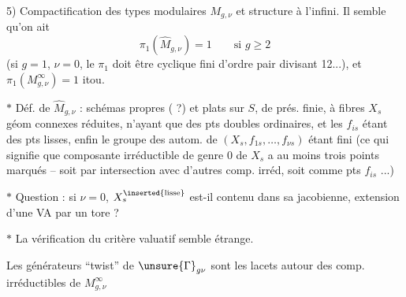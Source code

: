 5) Compactification des types modulaires $M_{g,\nu}$ et structure à l'infini. Il semble qu'on ait
\[
\pi_1(\widehat M_{g,\nu})=1\qquad\text{si }g\geq2
\]
(si $g=1$, $\nu=0$, le $\pi_1$ doit être cyclique fini d'ordre pair divisant 12...), et $\pi_1(M_{g,\nu}^{\infty})=1$ itou.

$*$ Déf. de $\widehat M_{g,\nu}$ : schémas  propres ( ?)  et plats sur $S$, de prés. finie, à fibres $X_s$ géom connexes réduites, n'ayant que des pts doubles ordinaires, et les $f_{is}$ étant des pts lisses, enfin le groupe des autom. de $(X_s,f_{1s},\ldots,f_{\nu s})$ étant fini (ce qui signifie que  composante irréductible de genre $0$ de $X_s$ a au moins trois points marqués -- soit par intersection avec d'autres comp. irréd, soit comme pts $f_{is}$ ...)

$*$ Question : si $\nu=0$, $X_s^{\inserted{\text{lisse}}}$ est-il contenu dans sa jacobienne,  extension d'une VA par un tore ?

$*$ La vérification du critère valuatif semble étrange.

Les générateurs ``twist'' de $\unsure{\Gamma}_{g\nu}$ sont les lacets autour des comp. irréductibles de $M_{g,\nu}^{\infty}$

